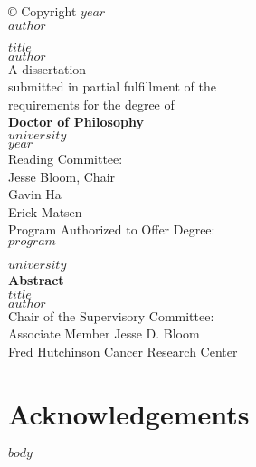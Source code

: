 \documentclass{report}
\begin{document}
\thispagestyle{empty}
\vspace*{\fill}
\begin{center}
© Copyright $year$ \\
$author$
\end{center}
\vspace*{\fill}
\newpage

\thispagestyle{empty}
\vspace*{\fill}
\begin{center}
\huge{$title$} \\
\vspace{1cm}
\Large{$author$} \\
\vspace{1cm}
A dissertation \\
submitted in partial fulfillment of the \\
requirements for the degree of \\
\vspace{1cm}
\textbf{Doctor of Philosophy} \\
\vspace{1cm}
$university$ \\
$year$ \\
\vspace{1cm}
Reading Committee: \\
Jesse Bloom, Chair \\
Gavin Ha \\
Erick Matsen \\
\vspace{1cm}
Program Authorized to Offer Degree: \\
$program$
\end{center}
\vspace*{\fill}
\newpage

\thispagestyle{empty}
\vspace*{\fill}
\begin{center}
$university$ \\
\vspace{1cm}
\textbf{Abstract} \\
\vspace{1cm}
\huge{$title$} \\
\vspace{1cm}
\Large{$author$} \\
\vspace{1cm}
Chair of the Supervisory Committee: \\
Associate Member Jesse D. Bloom \\
Fred Hutchinson Cancer Research Center \\
\vspace{1cm}
\end{center}
\vspace*{\fill}
\newpage

\tableofcontents
\newpage

\listoffigures
\newpage

\chapter*{Acknowledgements}

$body$



\end{document}
